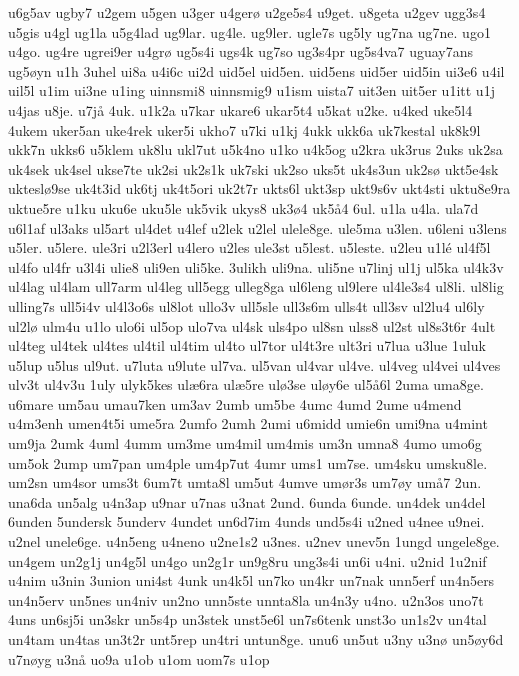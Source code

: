 u6g5av
ugby7
u2gem
u5gen
u3ger
u4ger^^f8
u2ge5s4
u9get.
u8geta
u2gev
ugg3s4
u5gis
u4gl
ug1la
u5g4lad
ug9lar.
ug4le.
ug9ler.
ugle7s
ug5ly
ug7na
ug7ne.
ugo1
u4go.
ug4re
ugrei9er
u4gr^^f8
ug5s4i
ugs4k
ug7so
ug3s4pr
ug5s4va7
uguay7ans
ug5^^f8yn
u1h
3uhel
ui8a
u4i6c
ui2d
uid5el
uid5en.
uid5ens
uid5er
uid5in
ui3e6
u4il
uil5l
u1im
ui3ne
u1ing
uinnsmi8
uinnsmig9
u1ism
uista7
uit3en
uit5er
u1itt
u1j
u4jas
u8je.
u7j^^e5
4uk.
u1k2a
u7kar
ukare6
ukar5t4
u5kat
u2ke.
u4ked
uke5l4
4ukem
uker5an
uke4rek
uker5i
ukho7
u7ki
u1kj
4ukk
ukk6a
uk7kestal
uk8k9l
ukk7n
ukks6
u5klem
uk8lu
ukl7ut
u5k4no
u1ko
u4k5og
u2kra
uk3rus
2uks
uk2sa
uk4sek
uk4sel
ukse7te
uk2si
uk2s1k
uk7ski
uk2so
uks5t
uk4s3un
uk2s^^f8
ukt5e4sk
uktesl^^f89se
uk4t3id
uk6tj
uk4t5ori
uk2t7r
ukts6l
ukt3sp
ukt9s6v
ukt4sti
uktu8e9ra
uktue5re
u1ku
uku6e
uku5le
uk5vik
ukys8
uk3^^f84
uk5^^e54
6ul.
u1la
u4la.
ula7d
u6l1af
ul3aks
ul5art
ul4det
u4lef
u2lek
u2lel
ulele8ge.
ule5ma
u3len.
u6leni
u3lens
u5ler.
u5lere.
ule3ri
u2l3erl
u4lero
u2les
ule3st
u5lest.
u5leste.
u2leu
u1l^^e9
ul4f5l
ul4fo
ul4fr
u3l4i
ulie8
uli9en
uli5ke.
3ulikh
uli9na.
uli5ne
u7linj
ul1j
ul5ka
ul4k3v
ul4lag
ul4lam
ull7arm
ul4leg
ull5egg
ulleg8ga
ul6leng
ul9lere
ul4le3s4
ul8li.
ul8lig
ulling7s
ull5i4v
ul4l3o6s
ul8lot
ullo3v
ull5sle
ull3s6m
ulls4t
ull3sv
ul2lu4
ul6ly
ul2l^^f8
ulm4u
u1lo
ulo6i
ul5op
ulo7va
ul4sk
uls4po
ul8sn
ulss8
ul2st
ul8s3t6r
4ult
ul4teg
ul4tek
ul4tes
ul4til
ul4tim
ul4to
ul7tor
ul4t3re
ult3ri
u7lua
u3lue
1uluk
u5lup
u5lus
ul9ut.
u7luta
u9lute
ul7va.
ul5van
ul4var
ul4ve.
ul4veg
ul4vei
ul4ves
ulv3t
ul4v3u
1uly
ulyk5kes
ul^^e66ra
ul^^e65re
ul^^f83se
ul^^f8y6e
ul5^^e56l
2uma
uma8ge.
u6mare
um5au
umau7ken
um3av
2umb
um5be
4umc
4umd
2ume
u4mend
u4m3enh
umen4t5i
ume5ra
2umfo
2umh
2umi
u6midd
umie6n
umi9na
u4mint
um9ja
2umk
4uml
4umm
um3me
um4mil
um4mis
um3n
umna8
4umo
umo6g
um5ok
2ump
um7pan
um4ple
um4p7ut
4umr
ums1
um7se.
um4sku
umsku8le.
um2sn
um4sor
ums3t
6um7t
umta8l
um5ut
4umve
um^^f8r3s
um7^^f8y
um^^e57
2un.
una6da
un5alg
u4n3ap
u9nar
u7nas
u3nat
2und.
6unda
6unde.
un4dek
un4del
6unden
5undersk
5underv
4undet
un6d7im
4unds
und5s4i
u2ned
u4nee
u9nei.
u2nel
unele6ge.
u4n5eng
u4neno
u2ne1s2
u3nes.
u2nev
unev5n
1ungd
ungele8ge.
un4gem
un2g1j
un4g5l
un4go
un2g1r
un9g8ru
ung3s4i
un6i
u4ni.
u2nid
1u2nif
u4nim
u3nin
3union
uni4st
4unk
un4k5l
un7ko
un4kr
un7nak
unn5erf
un4n5ers
un4n5erv
un5nes
un4niv
un2no
unn5ste
unnta8la
un4n3y
u4no.
u2n3os
uno7t
4uns
un6sj5i
un3skr
un5s4p
un3stek
unst5e6l
un7s6tenk
unst3o
un1s2v
un4tal
un4tam
un4tas
un3t2r
unt5rep
un4tri
untun8ge.
unu6
un5ut
u3ny
u3n^^f8
un5^^f8y6d
u7n^^f8yg
u3n^^e5
uo9a
u1ob
u1om
uom7s
u1op

